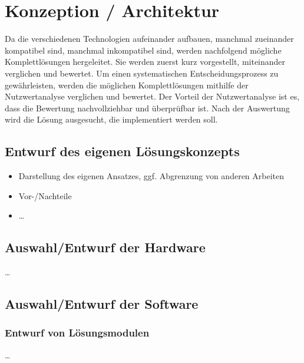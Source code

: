 
\chapter{Konzeption / Architektur} \label{Konzept}


Da die verschiedenen Technologien aufeinander aufbauen, manchmal zueinander kompatibel sind, manchmal inkompatibel sind, werden nachfolgend mögliche Komplettlösungen hergeleitet. Sie werden zuerst kurz vorgestellt, miteinander verglichen und bewertet. Um einen systematischen Entscheidungsprozess zu gewährleisten, werden die möglichen Komplettlösungen mithilfe der Nutzwertanalyse verglichen und bewertet. Der Vorteil der Nutzwertanalyse ist es, dass die Bewertung nachvollziehbar und überprüfbar ist. Nach der Auswertung wird die Lösung ausgesucht, die implementiert werden soll.

\section{Entwurf des eigenen Lösungskonzepts}
\begin{itemize}
\item Darstellung des eigenen Ansatzes, ggf. Abgrenzung von anderen Arbeiten
\item Vor-/Nachteile
\item \ldots
\end{itemize}

\section{Auswahl/Entwurf der Hardware}
\ldots
\section{Auswahl/Entwurf der Software}
\subsection{Entwurf von Lösungsmodulen}
\ldots



